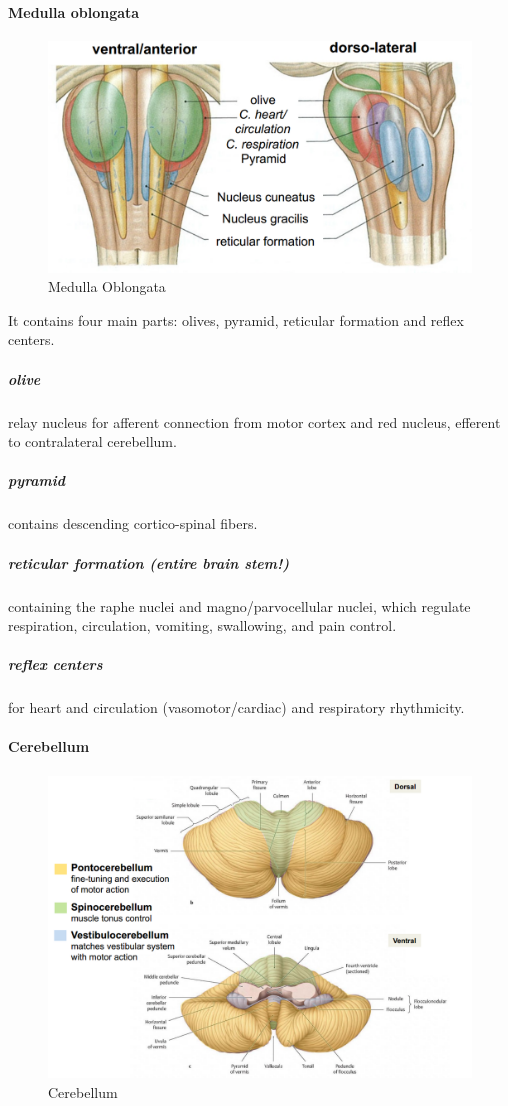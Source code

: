 \documentclass[12pt,article,oneside,a4paper]{memoir}
\begin{document}
\paragraph{Medulla oblongata}
\begin{figure}
	\centering
  	\includegraphics[width=\linewidth]{imgs/medullaOblongata.png}
	\caption{Medulla Oblongata}
  	\label{fig:medullaOblongata}
\end{figure}

It contains four main parts: olives, pyramid, reticular formation and reflex centers.\subparagraph{olive} relay nucleus for afferent connection from motor cortex and red nucleus, efferent to contralateral cerebellum.
\subparagraph{pyramid} contains descending cortico-spinal fibers.
\subparagraph{reticular formation (entire brain stem!)} containing the raphe nuclei and magno/parvocellular nuclei, which regulate respiration, circulation, vomiting, swallowing, and pain control.
\subparagraph{reflex centers} for heart and circulation (vasomotor/cardiac) and
respiratory rhythmicity.

\paragraph{Cerebellum}
\begin{figure}[H]
	\centering
  	\includegraphics[width=\linewidth]{imgs/cerebellum.png}
	\caption{Cerebellum}
  	\label{fig:cerebellum}
\end{figure}
\end{document}
